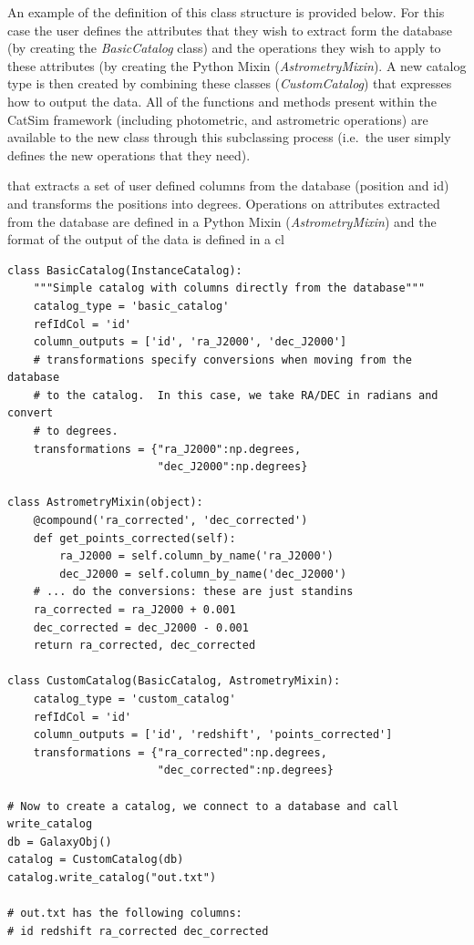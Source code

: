 \documentclass[]{article}
\begin{document}
An example of the definition of this class structure is provided
below. For this case the user defines the attributes that they wish to
extract form the database (by creating the {\it BasicCatalog} class)
and the operations they wish to apply to these attributes (by creating
the Python Mixin ({\it AstrometryMixin}). A new catalog type is then
created by combining these classes ({\it CustomCatalog}) that
expresses how to output the data. All of the functions and methods
present within the CatSim framework (including photometric, and
astrometric operations) are available to the new class through this
subclassing process (i.e.\ the user simply defines the new operations
that they need).


that extracts a set of user defined columns
from the database (position and id) and transforms the positions into
degrees. Operations on attributes extracted from the database are
defined in a Python Mixin ({\it AstrometryMixin}) and the format of
the output of
the data is defined in a cl 

\begin{verbatim}
class BasicCatalog(InstanceCatalog):
    """Simple catalog with columns directly from the database"""
    catalog_type = 'basic_catalog'
    refIdCol = 'id'
    column_outputs = ['id', 'ra_J2000', 'dec_J2000']
    # transformations specify conversions when moving from the database
    # to the catalog.  In this case, we take RA/DEC in radians and convert
    # to degrees.
    transformations = {"ra_J2000":np.degrees,
                       "dec_J2000":np.degrees}

class AstrometryMixin(object):
    @compound('ra_corrected', 'dec_corrected')
    def get_points_corrected(self):
        ra_J2000 = self.column_by_name('ra_J2000')
        dec_J2000 = self.column_by_name('dec_J2000')
    # ... do the conversions: these are just standins
    ra_corrected = ra_J2000 + 0.001
    dec_corrected = dec_J2000 - 0.001
    return ra_corrected, dec_corrected

class CustomCatalog(BasicCatalog, AstrometryMixin):
    catalog_type = 'custom_catalog'
    refIdCol = 'id'
    column_outputs = ['id', 'redshift', 'points_corrected']
    transformations = {"ra_corrected":np.degrees,
                       "dec_corrected":np.degrees}

# Now to create a catalog, we connect to a database and call write_catalog
db = GalaxyObj()
catalog = CustomCatalog(db)
catalog.write_catalog("out.txt")

# out.txt has the following columns:
# id redshift ra_corrected dec_corrected
\end{verbatim}
\end{document}
